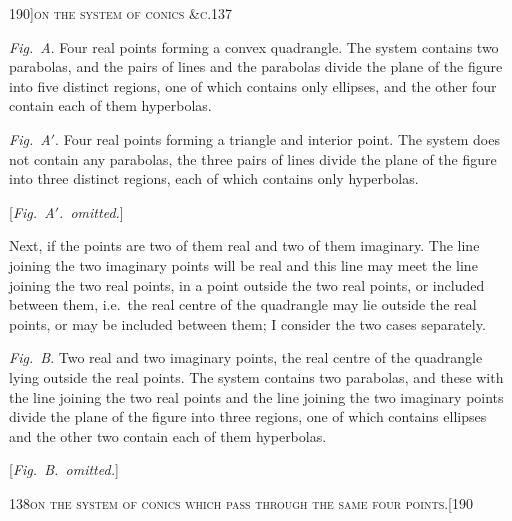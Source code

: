 \documentclass[11pt]{article}
\begin{document}
\newpage

\begin{center}
\small 190]\hfill\textsc{on the system of conics \&c.}\hfill\textsc{137}
\end{center}

\medskip

\noindent \emph{Fig.~A}. Four real points forming a convex quadrangle. The system contains two parabolas, and the pairs of lines and the parabolas divide the plane of the figure into five distinct regions, one of which contains only ellipses, and the other four contain each of them hyperbolas.

\emph{Fig.~A$'$}. Four real points forming a triangle and interior point. The system does not contain any parabolas, the three pairs of lines divide the plane of the figure into three distinct regions, each of which contains only hyperbolas.

\begin{center}
[\emph{Fig.\ A$'$.\ omitted.}]
\end{center}

Next, if the points are two of them real and two of them imaginary. The line joining the two imaginary points will be real and this line may meet the line joining the two real points, in a point outside the two real points, or included between them, i.e.\ the real centre of the quadrangle may lie outside the real points, or may be included between them; I consider the two cases separately.

\emph{Fig.~B}. Two real and two imaginary points, the real centre of the quadrangle lying outside the real points. The system contains two parabolas, and these with the line joining the two real points and the line joining the two imaginary points divide the plane of the figure into three regions, one of which contains ellipses and the other two contain each of them hyperbolas.

\begin{center}
[\emph{Fig.\ B.\ omitted.}]
\end{center}

\newpage

\begin{center}
\small 138\hfill\textsc{on the system of conics which pass through the same four points.}\hfill[190
\end{center}
\end{document}
